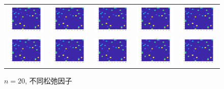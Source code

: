 \documentclass[UTF8,10.5pt,a4paper]{ctexart}
\theoremstyle{definition}
\theoremstyle{definition}
\begin{document}
\begin{figure}[htbp]
	\renewcommand{\captionfont}{\small}
	\centering
	\begin{tabular}{@{}ccccc@{}}
		\includegraphics[width=.18\textwidth]{alpha1n20.jpg} & 
		\includegraphics[width=.18\textwidth]{alpha2n20.jpg} & 
		\includegraphics[width=.18\textwidth]{alpha3n20.jpg} & 
		\includegraphics[width=.18\textwidth]{alpha4n20.jpg} & 
		\includegraphics[width=.18\textwidth]{alpha5n20.jpg}\\
		\includegraphics[width=.18\textwidth]{alpha6n20.jpg} & 
		\includegraphics[width=.18\textwidth]{alpha7n20.jpg} &
		\includegraphics[width=.18\textwidth]{alpha8n20.jpg} & 
		\includegraphics[width=.18\textwidth]{alpha9n20.jpg} & 
		\includegraphics[width=.18\textwidth]{alpha10n20.jpg}
	\end{tabular}
	\caption{$n=20$, 不同松弛因子}
	\label{alphan20figure}
\end{figure}
\end{document}
